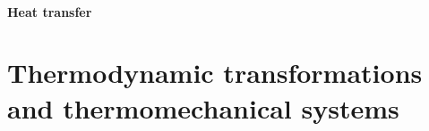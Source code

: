 \documentclass[letterpaper,10pt,english]{jupyterBook}
\begin{document}
\subsubsection*{Heat transfer}

\sphinxstepscope




\chapter{Thermodynamic transformations and thermomechanical systems}
\label{\detokenize{ch/thermodynamic-transformations:thermodynamic-transformations-and-thermomechanical-systems}}\label{\detokenize{ch/thermodynamic-transformations:classical-thermodynamics-transformations}}\label{\detokenize{ch/thermodynamic-transformations::doc}}
\end{document}
